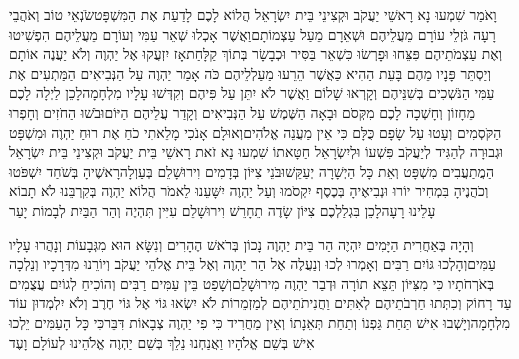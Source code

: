 \documentclass[../main/main.tex]{subfiles}
\begin{document}
\begin{multicols*}{\ncols}
וָאֹמַר שִׁמְעוּ נָא רָאשֵׁי יַעֲקֹב וּקְצִינֵי בֵּית יִשְׂרָאֵל הֲלוֹא לָכֶם לָדַעַת אֶת הַמִּשְׁפָּט\PreVerseSpace{}שֹׂנְאֵי טוֹב וְאֹהֲבֵי רָעָה גֹּזְלֵי עוֹרָם מֵעֲלֵיהֶם וּשְׁאֵרָם מֵעַל עַצְמוֹתָם\PreVerseSpace{}וַאֲשֶׁר אָכְלוּ שְׁאֵר עַמִּי וְעוֹרָם מֵעֲלֵיהֶם הִפְשִׁיטוּ וְאֶת עַצְמֹתֵיהֶם פִּצֵּחוּ וּפָרְשׂוּ כִּשְׁאֵר\SubEnd{} בַּסִּיר וּכְבָשָׂר בְּתוֹךְ קַלָּחַת\PreVerseSpace{}אָז יִזְעֲקוּ אֶל יַהְוֶה וְלֹא יַעֲנֶה אוֹתָם וְיַסְתֵּר פָּנָיו מֵהֶם בָּעֵת הַהִיא כַּאֲשֶׁר הֵרֵעוּ מַעַלְלֵיהֶם כֹּה אָמַר יַהְוֶה עַל הַנְּבִיאִים הַמַּתְעִים אֶת עַמִּי הַנֹּשְׁכִים בְּשִׁנֵּיהֶם וְקָרְאוּ שָׁלוֹם וַאֲשֶׁר לֹא יִתֵּן עַל פִּיהֶם וְקִדְּשׁוּ עָלָיו מִלְחָמָה\PreVerseSpace{}לָכֵן לַיְלָה לָכֶם מֵחָזוֹן וְחָשְׁכָה לָכֶם מִקְּסֹם וּבָאָה הַשֶּׁמֶשׁ עַל הַנְּבִיאִים וְקָדַר עֲלֵיהֶם הַיּוֹם\PreVerseSpace{}וּבֹשׁוּ הַחֹזִים וְחָפְרוּ הַקֹּסְמִים וְעָטוּ עַל שָׂפָם כֻּלָּם כִּי אֵין מַעֲנֵה אֱלֹהִים\PreVerseSpace{}וְאוּלָם אָנֹכִי מָלֵאתִי כֹחַ אֶת רוּחַ יַהְוֶה וּמִשְׁפָּט וּגְבוּרָה לְהַגִּיד לְיַעֲקֹב פִּשְׁעוֹ וּלְיִשְׂרָאֵל חַטָּאתוֹ \ClosedSection{}שִׁמְעוּ נָא זֹאת רָאשֵׁי בֵּית יַעֲקֹב וּקְצִינֵי בֵּית יִשְׂרָאֵל הַמֲתַעֲבִים מִשְׁפָּט וְאֵת כָּל הַיְשָׁרָה יְעַקֵּשׁוּ\PreVerseSpace{}בֹּנֵי\SubEnd{} צִיּוֹן בְּדָמִים וִירוּשָׁלֵם בְּעַוְלָה\PreVerseSpace{}רָאשֶׁיהָ בְּשֹׁחַד יִשְׁפֹּטוּ וְכֹהֲנֶיהָ בִּמְחִיר יוֹרוּ וּנְבִיאֶיהָ בְּכֶסֶף יִקְסֹמוּ וְעַל יַהְוֶה יִשָּׁעֵנוּ לֵאמֹר הֲלוֹא יַהְוֶה בְּקִרְבֵּנוּ לֹא תָבוֹא עָלֵינוּ רָעָה\PreVerseSpace{}לָכֵן בִּגְלַלְכֶם צִיּוֹן שָׂדֶה תֵחָרֵשׁ וִירוּשָׁלֵם עִיִּין תִּהְיֶה וְהַר הַבַּיִת לְבָמוֹת יָעַר\OpenSection{}\par
{}וְהָיָה בְּאַחֲרִית הַיָּמִים יִהְיֶה הַר בֵּית יַהְוֶה נָכוֹן בְּרֹאשׁ הֶהָרִים וְנִשָּׂא הוּא מִגְּבָעוֹת וְנָהֲרוּ עָלָיו עַמִּים\PreVerseSpace{}וְהָלְכוּ גּוֹיִם רַבִּים וְאָמְרוּ לְכוּ וְנַעֲלֶה אֶל הַר יַהְוֶה וְאֶל בֵּית אֱלֹהֵי יַעֲקֹב וְיוֹרֵנוּ מִדְּרָכָיו וְנֵלְכָה בְּאֹרְחֹתָיו כִּי מִצִּיּוֹן תֵּצֵא תוֹרָה וּדְבַר יַהְוֶה מִירוּשָׁלֵם\PreVerseSpace{}וְשָׁפַט בֵּין עַמִּים רַבִּים וְהוֹכִיחַ לְגוֹיִם עֲצֻמִים עַד רָחוֹק וְכִתְּתוּ חַרְבֹתֵיהֶם לְאִתִּים וַחֲנִיתֹתֵיהֶם לְמַזְמֵרוֹת לֹא יִשְׂאוּ גּוֹי אֶל גּוֹי חֶרֶב וְלֹא יִלְמְדוּן עוֹד מִלְחָמָה\PreVerseSpace{}וְיָשְׁבוּ אִישׁ תַּחַת גַּפְנוֹ וְתַחַת תְּאֵנָתוֹ וְאֵין מַחֲרִיד כִּי פִי יַהְוֶה צְבָאוֹת דִּבֵּר\PreVerseSpace{}כִּי כָּל הָעַמִּים יֵלְכוּ אִישׁ בְּשֵׁם אֱלֹהָיו וַאֲנַחְנוּ נֵלֵךְ בְּשֵׁם יַהְוֶה אֱלֹהֵינוּ לְעוֹלָם וָעֶד\OpenSection{}\par

\end{multicols*}
\end{document}

